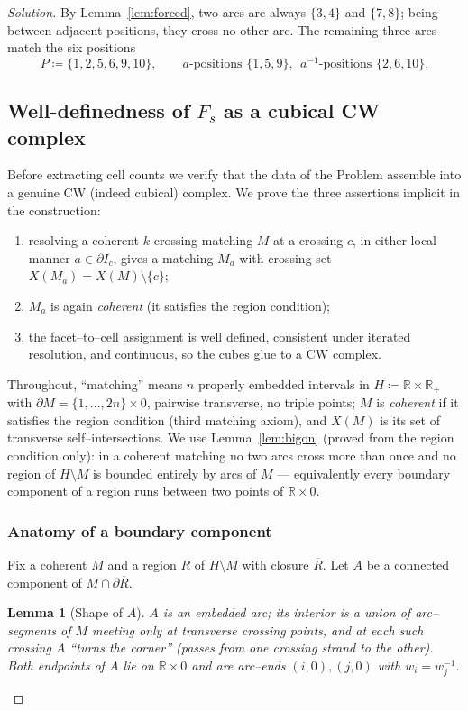 \documentclass{amsart}
\newtheorem{lemma}{Lemma}
\theoremstyle{definition}
\newcommand{\RR}{\mathbb{R}}
\newcommand{\defeq}{\coloneqq}
\newcommand{\bdy}{\partial}
\begin{document}
\begin{proof}[Solution]
By Lemma~\ref{lem:forced}, two arcs are always $\{3,4\}$ and $\{7,8\}$; being between adjacent
positions, they cross no other arc. The remaining three arcs match the six positions
\[
  P\defeq\{1,2,5,6,9,10\},\qquad a\text{-positions }\{1,5,9\},\ \ a^{-1}\text{-positions }\{2,6,10\}.
\]

\subsection{Well-definedness of $F_s$ as a cubical CW complex}\label{sec:welldef}

Before extracting cell counts we verify that the data of the Problem assemble into a genuine
CW (indeed cubical) complex. We prove the three assertions implicit in the construction:
\begin{enumerate}
\item[(W1)] resolving a coherent $k$-crossing matching $M$ at a crossing $c$, in either local
manner $a\in\bdy I_c$, gives a matching $M_a$ with crossing set $X(M_a)=X(M)\setminus\{c\}$;
\item[(W2)] $M_a$ is again \emph{coherent} (it satisfies the region condition);
\item[(W3)] the facet--to--cell assignment is well defined, consistent under iterated resolution,
and continuous, so the cubes glue to a CW complex.
\end{enumerate}

Throughout, ``matching'' means $n$ properly embedded intervals in $H\defeq\RR\times\RR_+$ with
$\bdy M=\{1,\dots,2n\}\times0$, pairwise transverse, no triple points; $M$ is \emph{coherent} if
it satisfies the region condition (third matching axiom), and $X(M)$ is its set of transverse
self–intersections. We use Lemma~\ref{lem:bigon} (proved from the region condition only): in a
coherent matching no two arcs cross more than once and no region of $H\setminus M$ is bounded
entirely by arcs of $M$ — equivalently every boundary component of a region runs between two
points of $\RR\times0$.

\subsubsection{Anatomy of a boundary component}\label{ssec:anatomy}

Fix a coherent $M$ and a region $R$ of $H\setminus M$ with closure $\overline R$. Let $A$ be a
connected component of $M\cap\bdy\overline R$.

\begin{lemma}[Shape of $A$]\label{lem:shapeA}
$A$ is an embedded arc; its interior is a union of arc–segments of $M$ meeting only at
transverse crossing points, and at each such crossing $A$ ``turns the corner'' (passes from one
crossing strand to the other). Both endpoints of $A$ lie on $\RR\times0$ and are arc–ends
$(i,0),(j,0)$ with $w_i=w_j^{-1}$.
\end{lemma}


\end{proof}
\end{document}
